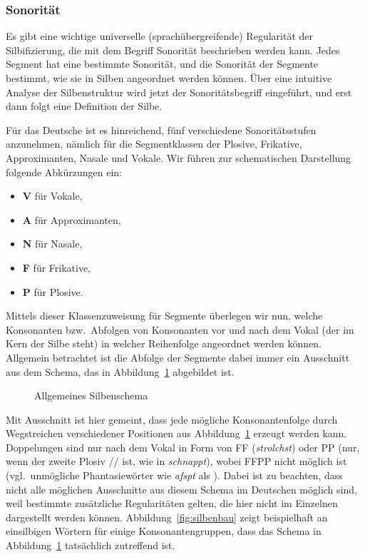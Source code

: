 \subsubsection{Sonorität}

\label{sec:sonoritaet}

Es gibt eine wichtige universelle (sprachübergreifende) Regularität der Silbifizierung, die mit dem Begriff Sonorität beschrieben werden kann.
Jedes Segment hat eine bestimmte Sonorität, und die Sonorität der Segmente bestimmt, wie sie in Silben angeordnet werden können.
Über eine intuitive Analyse der Silbenstruktur wird jetzt der Sonoritätsbegriff eingeführt, und erst dann folgt eine Definition der Silbe.

Für das Deutsche ist es hinreichend, fünf verschiedene Sonoritätsstufen anzunehmen, nämlich für die Segmentklassen der Plosive, Frikative, Approximanten, Nasale und Vokale.
Wir führen zur schematischen Darstellung folgende Abkürzungen ein:

\begin{itemize}\Lf
  \item \textbf{V} für Vokale,
  \item \textbf{A} für Approximanten,
  \item \textbf{N} für Nasale,
  \item \textbf{F} für Frikative,
  \item \textbf{P} für Plosive.
\end{itemize}

Mittels dieser Klassenzuweisung für Segmente überlegen wir nun, welche Konsonanten bzw.\ Abfolgen von Konsonanten vor und nach dem Vokal (der im Kern der Silbe steht) in welcher Reihenfolge angeordnet werden können.
Allgemein betrachtet ist die Abfolge der Segmente dabei immer ein Ausschnitt aus dem Schema, das in Abbildung~\ref{fig:silbenschema} abgebildet ist.

\begin{figure}
  \centering
  \caption{Allgemeines Silbenschema}
  \label{fig:silbenschema}
\end{figure}

Mit Ausschnitt ist hier gemeint, dass jede mögliche Konsonantenfolge durch Wegstreichen verschiedener Positionen aus Abbildung~\ref{fig:silbenschema} erzeugt werden kann.
Doppelungen sind nur nach dem Vokal in Form von FF (\textit{strolchst}) oder PP (nur, wenn der zweite Plosiv // ist, wie in \textit{schnappt}), wobei FFPP nicht möglich ist (vgl.\ unmögliche Phantasiewörter wie \textit{\Ast afspt} als \textipa{[afspt]}).
Dabei ist zu beachten, dass nicht alle möglichen Ausschnitte aus diesem Schema im Deutschen möglich sind, weil bestimmte zusätzliche Regularitäten gelten, die hier nicht im Einzelnen dargestellt werden können.
Abbildung~\ref{fig:silbenbau} zeigt beispielhaft an einsilbigen Wörtern für einige Konsonantengruppen, dass das Schema in Abbildung~\ref{fig:silbenschema} tatsächlich zutreffend ist.


